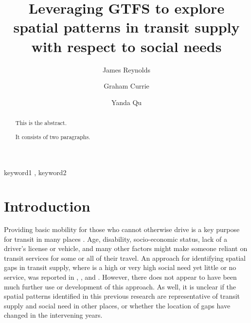 \documentclass[preprint, 3p,
authoryear]{elsarticle} %
\begin{document}
\begin{frontmatter}

  \title{Leveraging GTFS to explore spatial patterns in transit supply
with respect to social needs}
    \author[Public Transport Research Group (PTRG)]{James Reynolds%
  }
    \author[Public Transport Research Group (PTRG)]{Graham Currie%
  }
    \author[Public Transport Research Group (PTRG)]{Yanda Qu%
  }
  
  \begin{abstract}
  This is the abstract.

  It consists of two paragraphs.
  \end{abstract}
    \begin{keyword}
    keyword1 \sep 
    keyword2
  \end{keyword}
  
 \end{frontmatter}

\section{Introduction}\label{introduction}

Providing basic mobility for those who cannot otherwise drive is a key
purpose for transit in many places \citep{Currie:2016aa}. Age,
disability, socio-economic status, lack of a driver's license or
vehicle, and many other factors might make someone reliant on transit
services for some or all of their travel. An approach for identifying
spatial gaps in transit supply, where is a high or very high social need
yet little or no service, was reported in \citet{Currie2003Hobart},
\citet{Currie2004Gap}, \citet{Currie2007Identifying} and
\citet{currie2010identifying}. However, there does not appear to have
been much further use or development of this approach. As well, it is
unclear if the spatial patterns identified in this previous research are
representative of transit supply and social need in other places, or
whether the location of gaps have changed in the intervening years.
\end{document}
